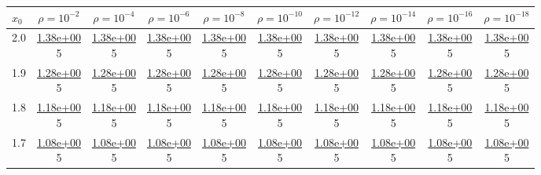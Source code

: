 \begin{table}[H]
\centering
\footnotesize
\begin{tabular}{|l||c|c|c|c|c|c|c|c|c|}
\toprule
$x_0$ & $\rho=10^{-2}$ & $\rho=10^{-4}$ & $\rho=10^{-6}$ & $\rho=10^{-8}$ & $\rho=10^{-10}$ & $\rho=10^{-12}$ & $\rho=10^{-14}$ & $\rho=10^{-16}$ & $\rho=10^{-18}$ \\
\midrule \midrule
2.0 & \makecell{\ul{1.38e+00} \\ 5} & \makecell{\ul{1.38e+00} \\ 5} & \makecell{\ul{1.38e+00} \\ 5} & \makecell{\ul{1.38e+00} \\ 5} & \makecell{\ul{1.38e+00} \\ 5} & \makecell{\ul{1.38e+00} \\ 5} & \makecell{\ul{1.38e+00} \\ 5} & \makecell{\ul{1.38e+00} \\ 5} & \makecell{\ul{1.38e+00} \\ 5} \\
\hline
 1.9 & \makecell{\ul{1.28e+00} \\ 5} & \makecell{\ul{1.28e+00} \\ 5} & \makecell{\ul{1.28e+00} \\ 5} & \makecell{\ul{1.28e+00} \\ 5} & \makecell{\ul{1.28e+00} \\ 5} & \makecell{\ul{1.28e+00} \\ 5} & \makecell{\ul{1.28e+00} \\ 5} & \makecell{\ul{1.28e+00} \\ 5} & \makecell{\ul{1.28e+00} \\ 5} \\
\hline
 1.8 & \makecell{\ul{1.18e+00} \\ 5} & \makecell{\ul{1.18e+00} \\ 5} & \makecell{\ul{1.18e+00} \\ 5} & \makecell{\ul{1.18e+00} \\ 5} & \makecell{\ul{1.18e+00} \\ 5} & \makecell{\ul{1.18e+00} \\ 5} & \makecell{\ul{1.18e+00} \\ 5} & \makecell{\ul{1.18e+00} \\ 5} & \makecell{\ul{1.18e+00} \\ 5} \\
\hline
 1.7 & \makecell{\ul{1.08e+00} \\ 5} & \makecell{\ul{1.08e+00} \\ 5} & \makecell{\ul{1.08e+00} \\ 5} & \makecell{\ul{1.08e+00} \\ 5} & \makecell{\ul{1.08e+00} \\ 5} & \makecell{\ul{1.08e+00} \\ 5} & \makecell{\ul{1.08e+00} \\ 5} & \makecell{\ul{1.08e+00} \\ 5} & \makecell{\ul{1.08e+00} \\ 5} \\

\end{tabular}
\end{table}
